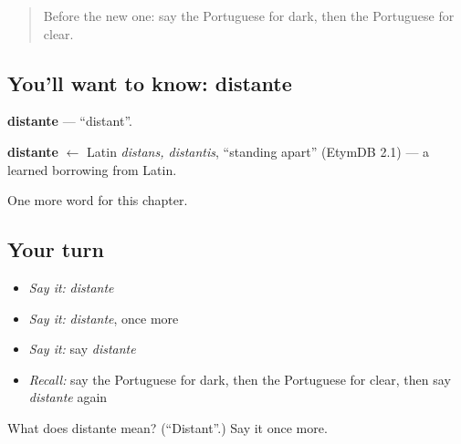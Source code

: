 \label{lesson:PT-C242-distante}



\begin{quote}
Before the new one: say the Portuguese for dark, then the Portuguese for clear.
\end{quote}

\subsection*{You'll want to know: distante}
\textbf{distante} — \textquotedblleft{}distant\textquotedblright{}.

\begin{cousinweb}
\textbf{distante} $\leftarrow$ Latin \emph{distans, distantis}, \textquotedblleft{}standing apart\textquotedblright{} (EtymDB 2.1) — a learned borrowing from Latin.
\end{cousinweb}

\begin{grammarlens}[title={What you've built}]
One more word for this chapter.
\end{grammarlens}

\subsection*{Your turn}
\begin{itemize}
\raggedright
  \item \emph{Say it:} \emph{distante}
  \item \emph{Say it:} \emph{distante}, once more
  \item \emph{Say it:} say \emph{distante}
  \item \emph{Recall:} say the Portuguese for dark, then the Portuguese for clear, then say \emph{distante} again
\end{itemize}

\begin{tcolorbox}[breakable,colback=teal!4,colframe=teal!35!black,title={Before you move on}]
What does distante mean? (\textquotedblleft{}Distant\textquotedblright{}.) Say it once more.
\end{tcolorbox}
